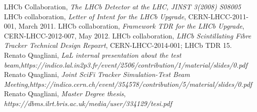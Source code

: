 \documentclass[paper=a4, fontsize=10pt]{scrartcl}
\numberwithin{equation}{section}		%
\numberwithin{figure}{section}			%
\numberwithin{table}{section}				%
\begin{document}
\begin{thebibliography}{100}
 LHCb Collaboration, \textit{The LHCb Detector at the LHC, JINST 3(2008) S08005}
 LHCb collaboration, \textit{Letter of Intent for the LHCb Upgrade}, CERN-LHCC-2011-001, March 2011.
 LHCb collaboration, \textit{Framework TDR for the LHCb Upgrade}, CERN-LHCC-2012-007, May 2012.
 LHCb collaboration, \textit{LHCb Scintillating Fibre Tracker Technical Design Repoxrt}, CERN-LHCC-2014-001; LHCb TDR 15.
 Renato Quagliani, \textit{LaL internal presentation about the test beam},\emph{https://indico.lal.in2p3.fr/event/2506/contribution/1/material/slides/0.pdf}
 Renato Quagliani, \textit{Joint SciFi Tracker Simulation-Test Beam Meeting},\emph{https://indico.cern.ch/event/354578/contribution/5/material/slides/0.pdf}
 Renato Quagliani, \textit{Master Degree thesis}, \emph{https://dbms.ilrt.bris.ac.uk/media/user/334129/tesi.pdf}

\end{thebibliography}
\end{document}

